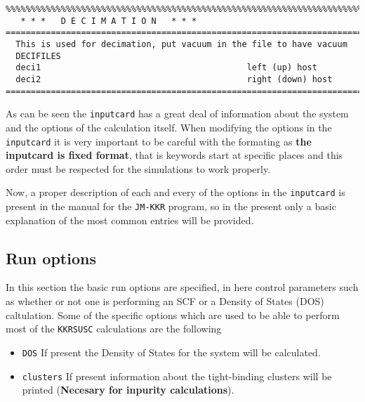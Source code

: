\documentclass[11pt,fleqn]{book} %
\begin{document}
\begin{VBox}
{{\begin{verbatim}
%%%%%%%%%%%%%%%%%%%%%%%%%%%%%%%%%%%%%%%%%%%%%%%%%%%%%%%%%%%%%%%%%%%%%%%%%%%%%%%%
   * * *   D E C I M A T I O N   * * *
================================================================================
  This is used for decimation, put vacuum in the file to have vacuum
  DECIFILES
  deci1                                         left (up) host
  deci2                                         right (down) host
================================================================================

\end{verbatim}
}}
\end{VBox}

As can be seen the \verb;inputcard; has a great deal of information about the system and the options of the calculation itself. When modifying the options in the \verb;inputcard; it is very important to be careful with the formating as \textbf{the inputcard is fixed format}, that is keywords start at specific places and this order must be respected for the simulations to work properly.

Now, a proper description of each and every of the options in the \verb;inputcard; is present in the manual for the \verb;JM-KKR; program, so in the present only a basic explanation of the most common entries will be provided.

\subsection{Run options}
In this section the basic run options are specified, in here control parameters such as whether or not one is performing an SCF or a Density of States (DOS) caltulation. Some of the specific options which are used to be able to perform most of the \verb;KKRSUSC; calculations are the following
\begin{itemize}
\item \verb;DOS; If present the Density of States for the system will be calculated.
\item \verb;clusters; If present information about the tight-binding clusters will be printed (\textbf{Necesary for inpurity calculations}).
\end{itemize}
\end{document}
